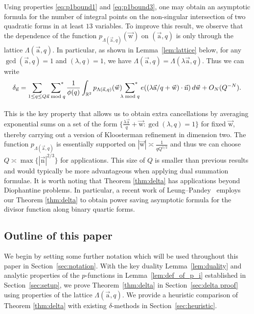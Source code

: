 \documentclass[letterpaper,11pt]{amsart}
\numberwithin{equation}{section}
\theoremstyle{definition}
\numberwithin{equation}{section}
\newcommand{\starsum}{\sideset{}{^*}\sum}
\newcommand{\ua}{\vec{\mathrm{a}}}
\newcommand{\uw}{{\vec{\mathrm{w}}}}
\newcommand{\R}{\mathbb{R}}
\newcommand{\na}{\ua}
\newcommand{\nn}{\vec{\mathrm{n}}}
\begin{document}
Using properties \eqref{eq:p1bound1} and \eqref{eq:p1bound3}, one may obtain an asymptotic formula for the number of integral points on the non-singular intersection of two quadratic forms in at least $13$ variables. To improve this result, we observe that the dependence of the function $p_{\Lambda(\na, q)}(\uw)$ on $(\na, q)$ is only through the lattice $\Lambda(\ua,q)$. In particular, as shown in Lemma~\ref{lem:lattice} below, for any $\gcd(\ua,q)=1$ and $(\lambda, q)=1$, we have $\Lambda(\ua, q)=\Lambda(\lambda\ua, q)$. Thus we can write 
\begin{equation*}%
    \delta_{\nn}
			=
			\sum_{1\leq q\leq Q}
			\underset{\hphantom{\ua\bmod{q}}}{\starsum_{\ua\bmod{q}}}\frac{1}{\phi(q)}		
			\int_{\R^2}
			p_{\Lambda(\ua,q)}(\uw)\starsum_{\lambda\bmod q}	
			e((\lambda\ua/q+\uw)\cdot\nn)\,d\uw
			+O_{N}(Q^{-N}).
\end{equation*}
This is the key property that allows us to obtain  extra cancellations by averaging exponential sums on a set of the form
$\{\frac{\lambda\ua}{q}+\uw:\gcd(\lambda,q)=1\}$ for fixed $\uw$, thereby
 carrying out a version of Kloosterman refinement in dimension two. The function $p_{\Lambda(\ua,q)}$  is essentially supported on $|\uw|\asymp \frac{1}{qQ^{1/2}}$ and thus we can choose $Q\asymp \max\{|\nn|^{2/3}\}$ for applications. This size of $Q$ is smaller than previous results and would typically be more advantageous when applying dual summation formulae. It is worth noting that Theorem \ref{thm:delta} has applications beyond Diophantine problems. In particular, a recent work of Leung--Pandey~\cite{LP} employs our Theorem \ref{thm:delta} to obtain power saving asymptotic formula for the divisor function along binary quartic forms. 


\subsection{Outline of this paper}  We begin by setting some further notation which will be used throughout this paper in Section~\ref{sec:notation}.
With the key duality Lemma~\ref{lem:duality} and analytic properties of the $p$-functions in Lemma~\ref{lem:def_of_p_i} established in Section~\ref{sec:setup}, we prove Theorem~\ref{thm:delta} in Section~\ref{sec:delta proof} using properties of the lattice $\Lambda(\ua, q)$. We provide a heuristic comparison of Theorem \ref{thm:delta} with existing $\delta$-methods in Section~\ref{sec:heuristic}.
\end{document}
